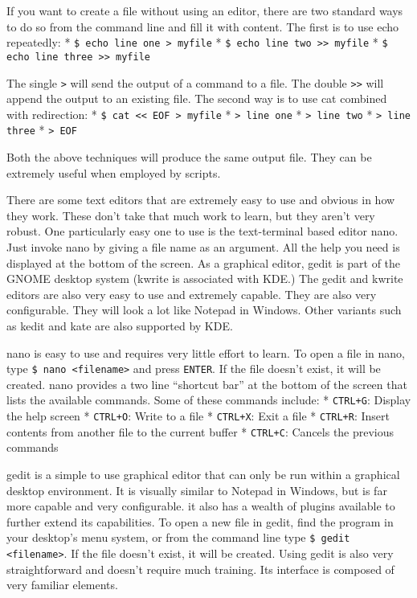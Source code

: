 If you want to create a file without using an editor, there are two
standard ways to do so from the command line and fill it with content.
The first is to use echo repeatedly: *
\texttt{\$ echo line one \textgreater{} myfile} *
\texttt{\$ echo line two \textgreater{}\textgreater{} myfile} *
\texttt{\$ echo line three \textgreater{}\textgreater{} myfile}

The single \texttt{\textgreater{}} will send the output of a command to
a file. The double \texttt{\textgreater{}\textgreater{}} will append the
output to an existing file. The second way is to use cat combined with
redirection: *
\texttt{\$ cat \textless{}\textless{} EOF \textgreater{} myfile} *
\texttt{\textgreater{} line one} * \texttt{\textgreater{} line two} *
\texttt{\textgreater{} line three} * \texttt{\textgreater{} EOF}

Both the above techniques will produce the same output file. They can be
extremely useful when employed by scripts.

There are some text editors that are extremely easy to use and obvious
in how they work. These don't take that much work to learn, but they
aren't very robust. One particularly easy one to use is the
text-terminal based editor nano. Just invoke nano by giving a file name
as an argument. All the help you need is displayed at the bottom of the
screen. As a graphical editor, gedit is part of the GNOME desktop system
(kwrite is associated with KDE.) The gedit and kwrite editors are also
very easy to use and extremely capable. They are also very configurable.
They will look a lot like Notepad in Windows. Other variants such as
kedit and kate are also supported by KDE.

nano is easy to use and requires very little effort to learn. To open a
file in nano, type \texttt{\$ nano \textless{}filename\textgreater{}}
and press \texttt{ENTER}. If the file doesn't exist, it will be created.
nano provides a two line ``shortcut bar'' at the bottom of the screen
that lists the available commands. Some of these commands include: *
\texttt{CTRL+G}: Display the help screen * \texttt{CTRL+O}: Write to a
file * \texttt{CTRL+X}: Exit a file * \texttt{CTRL+R}: Insert contents
from another file to the current buffer * \texttt{CTRL+C}: Cancels the
previous commands

gedit is a simple to use graphical editor that can only be run within a
graphical desktop environment. It is visually similar to Notepad in
Windows, but is far more capable and very configurable. it also has a
wealth of plugins available to further extend its capabilities. To open
a new file in gedit, find the program in your desktop's menu system, or
from the command line type
\texttt{\$ gedit \textless{}filename\textgreater{}}. If the file doesn't
exist, it will be created. Using gedit is also very straightforward and
doesn't require much training. Its interface is composed of very
familiar elements.

